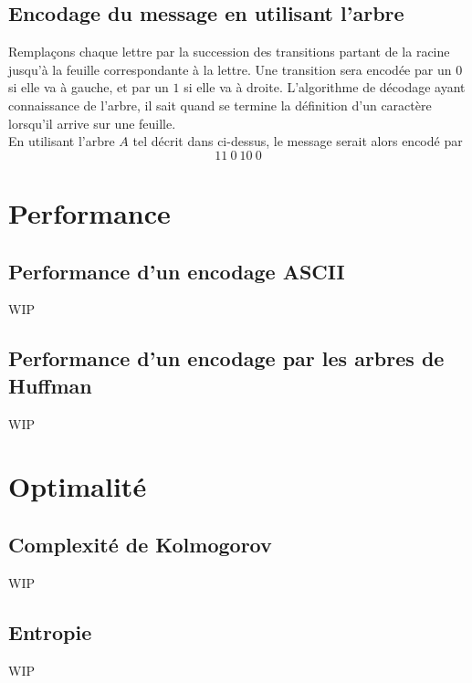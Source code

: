 \documentclass[a4paper, 12pt]{article}
\begin{document}
\subsection{Encodage du message en utilisant l'arbre}
Remplaçons chaque lettre par la succession des transitions partant de la racine jusqu'à la feuille correspondante à la lettre. Une transition sera encodée par un $0$ si elle va à gauche, et par un $1$ si elle va à droite. L'algorithme de décodage ayant connaissance de l'arbre, il sait quand se termine la définition d'un caractère lorsqu'il arrive sur une feuille. \\
En utilisant l'arbre $A$ tel décrit dans ci-dessus, le message serait alors encodé par
$$
11\ 0\ 10\ 0
$$

\newpage

\section{Performance}

\subsection{Performance d'un encodage ASCII}
WIP
\subsection{Performance d'un encodage par les arbres de Huffman}
WIP

\newpage

\section{Optimalité}

\subsection{Complexité de Kolmogorov}
WIP

\subsection{Entropie}
WIP
\end{document}
